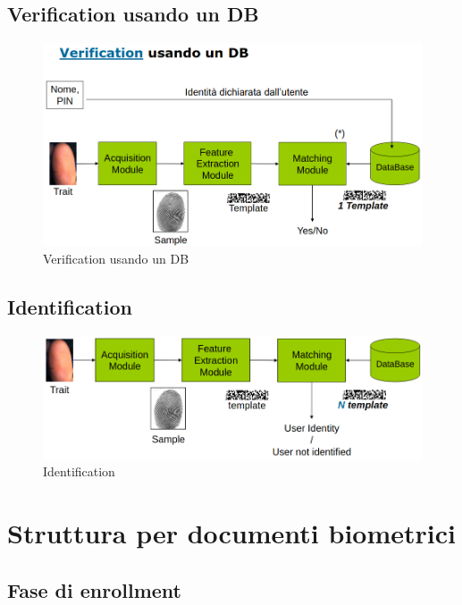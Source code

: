 \documentclass{report}
\begin{document}
\newpage

\subsection{Verification usando un DB}

\begin{figure}[ht]
    \centering
    \includegraphics[width=0.95\linewidth]{images/verification-gen.png}
    \caption{Verification usando un DB}
    \label{fig:verification-gen}
\end{figure}

\newpage
\subsection{Identification}

\begin{figure}[ht]
    \centering
    \includegraphics[width=0.95\linewidth]{images/identification-gen.png}
    \caption{Identification}
    \label{fig:id-gen}
\end{figure}

\section{Struttura per documenti biometrici}

\subsection{Fase di enrollment}
\end{document}

